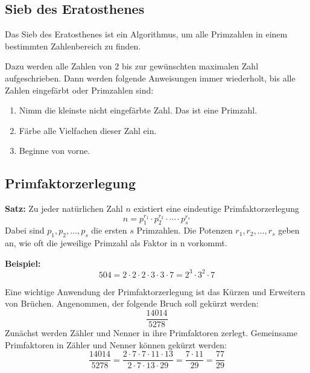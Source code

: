 \subsection{Sieb des Eratosthenes}

Das Sieb des Eratosthenes ist ein Algorithmus, um alle Primzahlen in einem bestimmten Zahlenbereich zu finden.

Dazu werden alle Zahlen von $2$ bis zur gewünschten maximalen Zahl aufgeschrieben. Dann werden folgende Anweisungen immer wiederholt, bis alle Zahlen eingefärbt oder Primzahlen sind:
\begin{enumerate}
  \item Nimm die kleinste nicht eingefärbte Zahl. Das ist eine Primzahl.
  \item Färbe alle Vielfachen dieser Zahl ein.
  \item Beginne von vorne.
\end{enumerate}

\newpage
\subsection{Primfaktorzerlegung}

\begin{theorem}
  \textbf{Satz:} Zu jeder natürlichen Zahl $n$ existiert eine eindeutige Primfaktorzerlegung
  \[
    n = p_{1}^{r_{1}} \cdot p_{2}^{r_{2}} \cdot \cdots \cdot p_{s}^{r_{s}}
  \]
  Dabei sind $p_{1}, p_{2}, \ldots, p_{s}$ die ersten $s$ Primzahlen. Die Potenzen $r_{1}, r_{2},\ldots, r_{s}$ geben an, wie oft die jeweilige Primzahl als Faktor in n vorkommt.
\end{theorem}
\begin{example}
  \textbf{Beispiel:}
  \[
    504 = 2\cdot 2\cdot 2\cdot 3\cdot 3\cdot 7 = 2^{3}\cdot 3^{2}\cdot 7
  \]
\end{example}
Eine wichtige Anwendung der Primfaktorzerlegung ist das Kürzen und Erweitern von Brüchen. Angenommen, der folgende Bruch soll gekürzt werden:
\[
  \frac{14014}{5278}
\]
Zunächst werden Zähler und Nenner in ihre Primfaktoren zerlegt. Gemeinsame Primfaktoren in Zähler und Nenner können gekürzt werden:
\[
  \frac{14014}{5278} = \frac{2\cdot 7\cdot 7\cdot 11\cdot 13}{2\cdot 7\cdot 13\cdot 29} = \frac{7\cdot 11}{29} = \frac{77}{29}
\]

